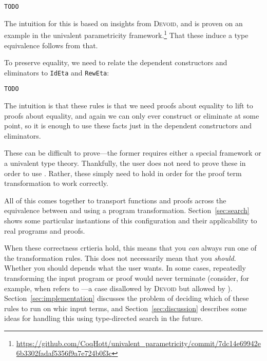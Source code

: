 \begin{lstlisting}
TODO
\end{lstlisting}
The intuition for this is based on insights from \textsc{Devoid},
and is proven on an example in the univalent parametricity framework.\footnote{\url{https://github.com/CoqHott/univalent_parametricity/commit/7dc14e69942e6b3302fadaf5356f9a7e724b0f3c}}
That these induce a type equivalence follows from that.

To preserve equality, we need to relate the dependent constructors and eliminators to
\lstinline{IdEta} and \lstinline{RewEta}:

\begin{lstlisting}
TODO
\end{lstlisting}
The intuition is that these rules is that we need proofs about equality to lift to proofs about equality,
and again we can only ever construct or eliminate at some point, so it is enough
to use these facts just in the dependent constructors and eliminators.

These can be difficult to prove---the former requires either a special framework %
or a univalent type theory.
Thankfully, the user does not need to prove these in order to use \toolname.
Rather, these simply need to hold in order for the proof term transformation to work correctly.

All of this comes together to transport functions and proofs across the equivalence between \A and \B
using a program transformation.
Section~\ref{sec:search} shows some particular instantions of this configuration and their applicability to real programs and proofs.

When these correctness crtieria hold, this means that you \textit{can} always run one of the transformation rules.
This does not necessarily mean that you \textit{should}.
Whether you should depends what the user wants.
In some cases, repeatedly transforming the input program or proof would never terminate
(consider, for example, when \B refers to \A---a case disallowed by \textsc{Devoid} but allowed by \toolname).
Section~\ref{sec:implementation} discusses the problem of deciding which of these rules to run
on whic input terms, and Section~\ref{sec:discussion} describes some ideas
for handling this using type-directed search in the future.



